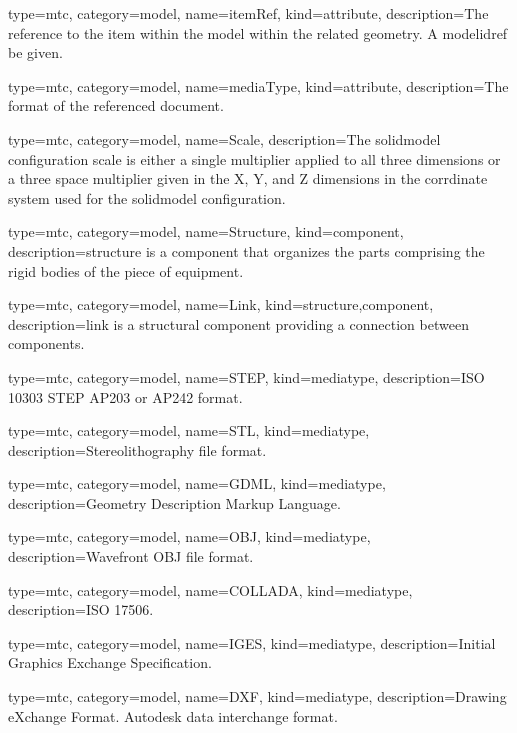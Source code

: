 {
  type=mtc,
  category=model,
  name={itemRef},
  kind={attribute},
  description={The reference to the item within the model within the related geometry. A \gls{modelidref} \MUST be given.}
}

{
  type=mtc,
  category=model,
  name={mediaType},
  kind={attribute},
  description={The format of the referenced document.}
}

{
  type=mtc,
  category=model,
  name={Scale},
  description={The \gls{solidmodel configuration} \gls{scale} is either a single multiplier applied to all three dimensions or a three space multiplier given in the X, Y, and Z dimensions in the corrdinate system used for the \gls{solidmodel configuration}.}
}

{
  type=mtc,
  category=model,
  name={Structure},
  kind={component},
  description={\gls{structure} is a \gls{component} that \glspl{organize} the parts comprising the rigid bodies of the piece of equipment.}
}


{
  type=mtc,
  category=model,
  name={Link},
  kind={structure,component},
  description={\gls{link} is a structural \gls{component} providing a connection between \gls{component}s.}
}


{
  type=mtc,
  category=model,
  name={STEP},
  kind={mediatype},
  description={ISO 10303 STEP AP203 or AP242 format.}
}

{
  type=mtc,
  category=model,
  name={STL},
  kind={mediatype},
  description={Stereolithography file format.}
}

{
  type=mtc,
  category=model,
  name={GDML},
  kind={mediatype},
  description={Geometry Description Markup Language.}
}

{
  type=mtc,
  category=model,
  name={OBJ},
  kind={mediatype},
  description={Wavefront OBJ file format.}
}

{
  type=mtc,
  category=model,
  name={COLLADA},
  kind={mediatype},
  description={ISO 17506.}
}

{
  type=mtc,
  category=model,
  name={IGES},
  kind={mediatype},
  description={Initial Graphics Exchange Specification.}
}

{
  type=mtc,
  category=model,
  name={DXF},
  kind={mediatype},
  description={Drawing eXchange Format. Autodesk data interchange format.}
}


